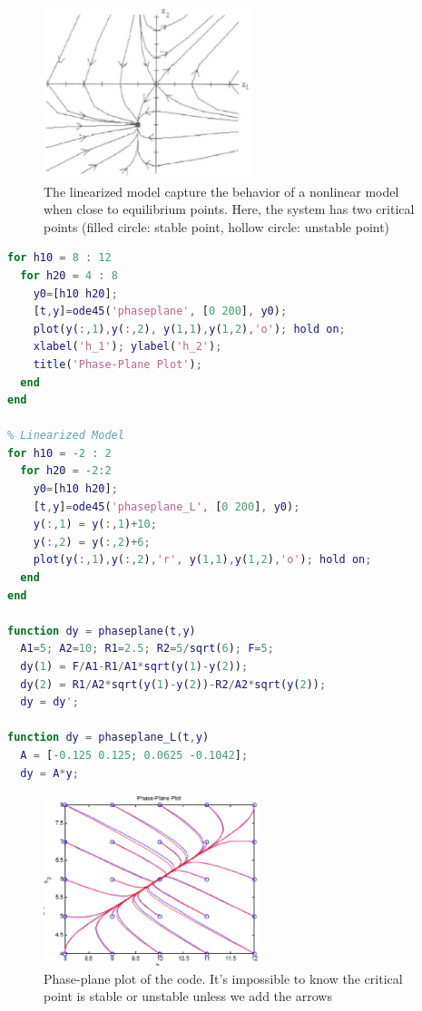 \begin{figure}[htb]
  \centerline{\includegraphics[height=5cm]{./images/phase-plane_nonlinear.eps}}
  \caption{The linearized model capture the behavior of a nonlinear
    model when close to equilibrium points. Here, the system has two
    critical points (filled circle: stable point, hollow circle: unstable
    point)}
\label{fig:phase-plane_nonlinear}
\end{figure}


\begin{lstlisting}[language=MatLab]
% Nonlinear Model
for h10 = 8 : 12
  for h20 = 4 : 8
    y0=[h10 h20];
    [t,y]=ode45('phaseplane', [0 200], y0);
    plot(y(:,1),y(:,2), y(1,1),y(1,2),'o'); hold on;
    xlabel('h_1'); ylabel('h_2');
    title('Phase-Plane Plot');
  end
end

% Linearized Model
for h10 = -2 : 2
  for h20 = -2:2
    y0=[h10 h20];
    [t,y]=ode45('phaseplane_L', [0 200], y0);
    y(:,1) = y(:,1)+10; 
    y(:,2) = y(:,2)+6;
    plot(y(:,1),y(:,2),'r', y(1,1),y(1,2),'o'); hold on;
  end
end

function dy = phaseplane(t,y)
  A1=5; A2=10; R1=2.5; R2=5/sqrt(6); F=5;
  dy(1) = F/A1-R1/A1*sqrt(y(1)-y(2));
  dy(2) = R1/A2*sqrt(y(1)-y(2))-R2/A2*sqrt(y(2));
  dy = dy';

function dy = phaseplane_L(t,y)
  A = [-0.125 0.125; 0.0625 -0.1042];
  dy = A*y;
\end{lstlisting}

\begin{figure}[htb]
  \centerline{\includegraphics[height=5cm]{./images/phase-plane_plot.eps}}
  \caption{Phase-plane plot of the code. It's
  impossible to know the critical point is stable
  or unstable unless we add the arrows}
  \label{fig:phase-plane_plot}
\end{figure}


